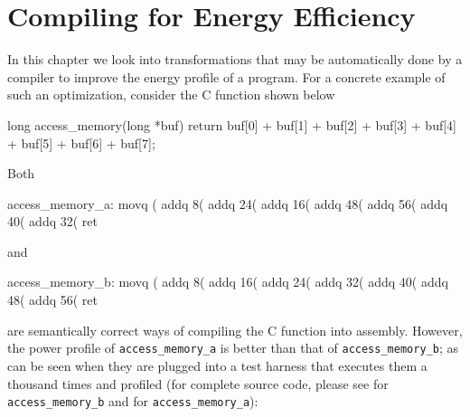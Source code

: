 \chapter{Compiling for Energy Efficiency}

\label{Chapter3}


In this chapter we look into transformations that may be automatically
done by a compiler to improve the energy profile of a program.  For a
concrete example of such an optimization, consider the C function
shown below

\begin{ccode}
long access_memory(long *buf) {
  return buf[0] + buf[1] + buf[2] + buf[3] +
         buf[4] + buf[5] + buf[6] + buf[7];
}
\end{ccode}

Both

\begin{gascode}
access_memory_a:
  movq    (%
  addq    8(%
  addq    24(%
  addq    16(%
  addq    48(%
  addq    56(%
  addq    40(%
  addq    32(%
  ret
\end{gascode}

and

\begin{gascode}
access_memory_b:
  movq    (%
  addq    8(%
  addq    16(%
  addq    24(%
  addq    32(%
  addq    40(%
  addq    48(%
  addq    56(%
  ret
\end{gascode}

are semantically correct ways of compiling the C function into
assembly.  However, the power profile of \texttt{access\_memory\_a} is
better than that of \texttt{access\_memory\_b}; as can be seen when
they are plugged into a test harness that executes them a thousand
times and profiled (for complete source code, please see
 for \texttt{access\_memory\_b} and
 for \texttt{access\_memory\_a}):

